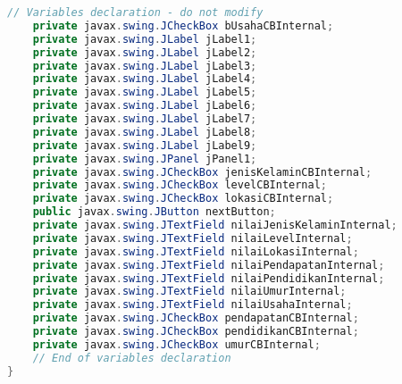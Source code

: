 \begin{lstlisting}[language=Java, caption=TampilanBobotKetetanggaan.java]
    // Variables declaration - do not modify                     
    private javax.swing.JCheckBox bUsahaCBInternal;
    private javax.swing.JLabel jLabel1;
    private javax.swing.JLabel jLabel2;
    private javax.swing.JLabel jLabel3;
    private javax.swing.JLabel jLabel4;
    private javax.swing.JLabel jLabel5;
    private javax.swing.JLabel jLabel6;
    private javax.swing.JLabel jLabel7;
    private javax.swing.JLabel jLabel8;
    private javax.swing.JLabel jLabel9;
    private javax.swing.JPanel jPanel1;
    private javax.swing.JCheckBox jenisKelaminCBInternal;
    private javax.swing.JCheckBox levelCBInternal;
    private javax.swing.JCheckBox lokasiCBInternal;
    public javax.swing.JButton nextButton;
    private javax.swing.JTextField nilaiJenisKelaminInternal;
    private javax.swing.JTextField nilaiLevelInternal;
    private javax.swing.JTextField nilaiLokasiInternal;
    private javax.swing.JTextField nilaiPendapatanInternal;
    private javax.swing.JTextField nilaiPendidikanInternal;
    private javax.swing.JTextField nilaiUmurInternal;
    private javax.swing.JTextField nilaiUsahaInternal;
    private javax.swing.JCheckBox pendapatanCBInternal;
    private javax.swing.JCheckBox pendidikanCBInternal;
    private javax.swing.JCheckBox umurCBInternal;
    // End of variables declaration                   
}

\end{lstlisting}

